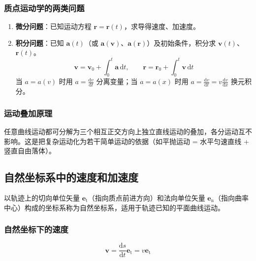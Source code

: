     \subsubsection{质点运动学的两类问题}
    \begin{enumerate}
        \item \textbf{微分问题}：已知运动方程 $\boldsymbol{r}=\boldsymbol{r}(t)$，求导得速度、加速度。
        \item \textbf{积分问题}：已知 $\boldsymbol{a}(t)$（或 $\boldsymbol{a}(\boldsymbol{v})$、$\boldsymbol{a}(\boldsymbol{r})$）及初始条件，积分求 $\boldsymbol{v}(t)$、$\boldsymbol{r}(t)$。
        \[
        \boldsymbol{v}=\boldsymbol{v}_{0}+\int_{0}^{t}\boldsymbol{a}\,\mathrm{d}t,\qquad
        \boldsymbol{r}=\boldsymbol{r}_{0}+\int_{0}^{t}\boldsymbol{v}\,\mathrm{d}t
        \]
        当 $a=a(v)$ 时用 $\displaystyle a=\frac{\mathrm{d}v}{\mathrm{d}t}$ 分离变量；当 $a=a(x)$ 时用 $\displaystyle a=\frac{\mathrm{d}v}{\mathrm{d}t}=v\frac{\mathrm{d}v}{\mathrm{d}x}$ 换元积分。
    \end{enumerate}

    \subsubsection{运动叠加原理}
    任意曲线运动都可分解为三个相互正交方向上独立直线运动的叠加，各分运动互不影响。这是把复杂运动化为若干简单运动的依据（如平抛运动 = 水平匀速直线 + 竖直自由落体）。

    \subsection{自然坐标系中的速度和加速度}
    以轨迹上的切向单位矢量 $\boldsymbol{e}_{\mathrm{t}}$（指向质点前进方向）和法向单位矢量 $\boldsymbol{e}_{\mathrm{n}}$（指向曲率中心）构成的坐标系称为自然坐标系，适用于轨迹已知的平面曲线运动。

    \subsubsection{自然坐标下的速度}
    \[
    \boldsymbol{v}=\frac{\mathrm{d}s}{\mathrm{d}t}\boldsymbol{e}_{\mathrm{t}}=v\boldsymbol{e}_{\mathrm{t}}
    \]

